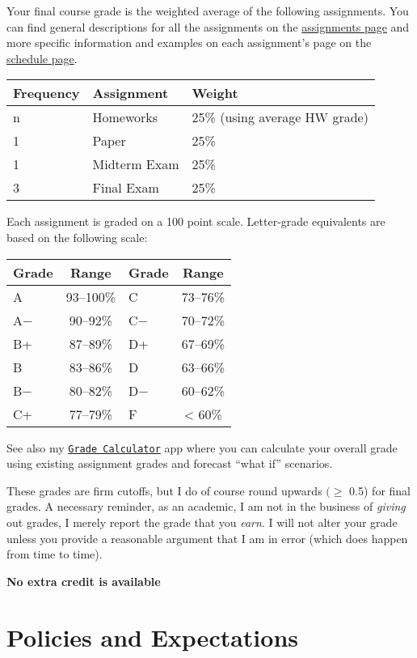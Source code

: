 \documentclass{article}
\begin{document}
Your final course grade is the weighted average of the following
assignments. You can find general descriptions for all the assignments
on the \href{assignments/}{assignments page} and more specific
information and examples on each assignment's page on the
\href{schedule/}{schedule page}.

\begin{tabular}{l|l|l}
\hline
Frequency & Assignment & Weight\\
\hline
n & Homeworks & 25\% (using average HW grade)\\
\hline
1 & Paper & 25\%\\
\hline
1 & Midterm Exam & 25\%\\
\hline
3 & Final Exam & 25\%\\
\hline
\end{tabular}

Each assignment is graded on a 100 point scale. Letter-grade equivalents
are based on the following scale:

\begin{table}
\centering
\begin{tabular}{l|c|l|c}
\hline
Grade & Range & Grade & Range\\
\hline
A & 93–100\% & C & 73–76\%\\
\hline
A− & 90–92\% & C− & 70–72\%\\
\hline
B+ & 87–89\% & D+ & 67–69\%\\
\hline
B & 83–86\% & D & 63–66\%\\
\hline
B− & 80–82\% & D− & 60–62\%\\
\hline
C+ & 77–79\% & F & < 60\%\\
\hline
\end{tabular}
\end{table}

See also my
\href{https://ryansafner.shinyapps.io/game_grade_calculator/}{
\texttt{Grade\ Calculator}} app where you can calculate your overall
grade using existing assignment grades and forecast ``what if''
scenarios.

These grades are firm cutoffs, but I do of course round upwards
\((\geq\) 0.5) for final grades. A necessary reminder, as an academic, I
am not in the business of \emph{giving} out grades, I merely report the
grade that you \emph{earn}. I will not alter your grade unless you
provide a reasonable argument that I am in error (which does happen from
time to time).

\textbf{No extra credit is available}

\hypertarget{policies-and-expectations}{%
\section{Policies and Expectations}\label{policies-and-expectations}}
\end{document}

